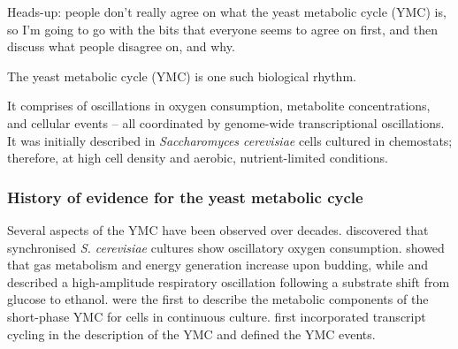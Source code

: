 Heads-up: people don't really agree on what the yeast metabolic cycle (YMC) is, so I'm going to go with the bits that everyone seems to agree on first, and then discuss what people disagree on, and why.


The yeast metabolic cycle (YMC) is one such biological rhythm.


It comprises of oscillations in oxygen consumption, metabolite concentrations, and cellular events -- all coordinated by genome-wide transcriptional oscillations.
It was initially described in \emph{Saccharomyces cerevisiae} cells cultured in chemostats; therefore, at high cell density and aerobic,
nutrient-limited conditions.

\subsubsection{History of evidence for the yeast metabolic cycle}
\label{subsubsec:intro-ymc-definition-history}

Several aspects of the YMC have been observed over decades.
\citet{nosohSYNCHRONIZATIONBUDDINGCYCLE1962} discovered that synchronised \emph{S. cerevisiae} cultures show oscillatory oxygen consumption.
\citet{kasparvonmeyenburgEnergeticsBuddingCycle1969} showed that gas metabolism and energy generation increase upon budding, while and \citet{mochanRespiratoryOscillationsAdapting1973} described a high-amplitude respiratory oscillation following a substrate shift from glucose to ethanol.
\citet{satroutdinovOscillatoryMetabolismSaccharomyces1992} were the first to describe the metabolic components of the short-phase YMC for cells in continuous culture.
\citet{tuLogicYeastMetabolic2005} first incorporated transcript cycling in the description of the YMC and defined the YMC events.

